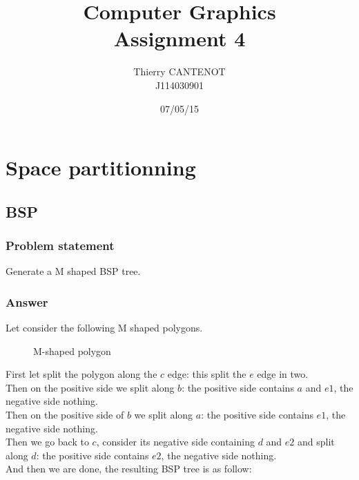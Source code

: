 \documentclass[a4paper,10pt]{article}
\title{\textbf{Computer Graphics} \\ Assignment 4}
\author{Thierry CANTENOT \\ J114030901}
\date{07/05/15}
\begin{document}
\maketitle

\section{Space partitionning}
\bigskip

\subsection{BSP}
\bigskip

\subsubsection{Problem statement}
\bigskip

Generate a M shaped BSP tree.

\subsubsection{Answer}
\bigskip

Let consider the following M shaped polygons.

    \begin{figure}[!htb]\centering

            \caption{M-shaped polygon}
    \end{figure}

\noindent
First let split the polygon along the $c$ edge: this split the $e$ edge in two. \\
Then on the positive side we split along $b$: the positive side contains $a$ and $e1$, the negative side nothing. \\
Then on the positive side of $b$ we split along $a$: the positive side contains $e1$, the negative side nothing. \\
Then we go back to $c$, consider its negative side containing $d$ and $e2$ and split along $d$: the positive side contains $e2$, the negative side nothing. \\
And then we are done, the resulting BSP tree is as follow:
\end{document}
